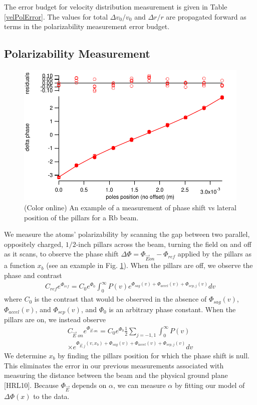\documentclass[twocolumn, prl,showpacs,superscriptaddress]{revtex4-1}   %
\newcommand{\figref}[1]{Fig. \ref{#1}}
\begin{document}
The error budget for velocity distribution measurement is given in Table \ref{velPolError}. The values for total $\Delta v_0/v_0$ and $\Delta r/r$ are propagated forward as terms in the polarizability measurement error budget.

\subsection{Polarizability Measurement}

\begin{figure}
\includegraphics[width=\linewidth,keepaspectratio]{dPvMP_150327_q.pdf}
\caption{\label{dPvMPExample}(Color online) An example of a measurement of phase shift vs lateral position of the pillars for a Rb beam.}
\end{figure}

We measure the atoms' polarizability by scanning the gap between two parallel, oppositely charged, $1/2$-inch pillars across the beam, turning the field on and off as it scans, to observe the phase shift $\Delta\Phi = \Phi_{\vec{E} on} - \Phi_{ref}$ applied by the pillars as a function $x_b$ (see an example in \figref{dPvMPExample}). When the pillars are off, we observe the phase and contrast
\begin{align}
	C_{ref}e^{\Phi_{ref}} = 
		C_0e^{\Phi_0}
		\int_0^{\infty} P(v) 
		e^{\Phi_{sag}(v) + \Phi_{accel}(v) + \Phi_{sep,j}(v)} 
		dv
	\label{CPRef}
\end{align}
where $C_0$ is the contrast that would be observed in the absence of $\Phi_{sag}(v)$, $\Phi_{accel}(v)$, and $\Phi_{sep}(v)$, and $\Phi_0$ is an arbitrary phase constant. When the pillars are on, we instead observe
\begin{align}
	C_{\vec{E}\textit{ on}}e^{\Phi_{\vec{E}\textit{ on}}} = 
		C_0e^{\Phi_0}		
		\frac{1}{2} \sum_{j=-1,1}
		\int_0^{\infty} P(v) \nonumber \\ \times
		e^{
			\Phi_{\vec{E},j}(v,x_b) + 
			\Phi_{sag}(v) + \Phi_{accel}(v) + \Phi_{sep,j}(v)
		} 
		dv
	\label{CPEOn}
\end{align}
We determine $x_b$ by finding the pillars position for which the phase shift is null. This eliminates the error in our previous measurements associated with measuring the distance between the beam and the physical ground plane [HRL10].
Because $\Phi_{\vec{E}}$ depends on $\alpha$, we can measure $\alpha$ by fitting our model of $\Delta\Phi(x)$ to the data.
\end{document}
